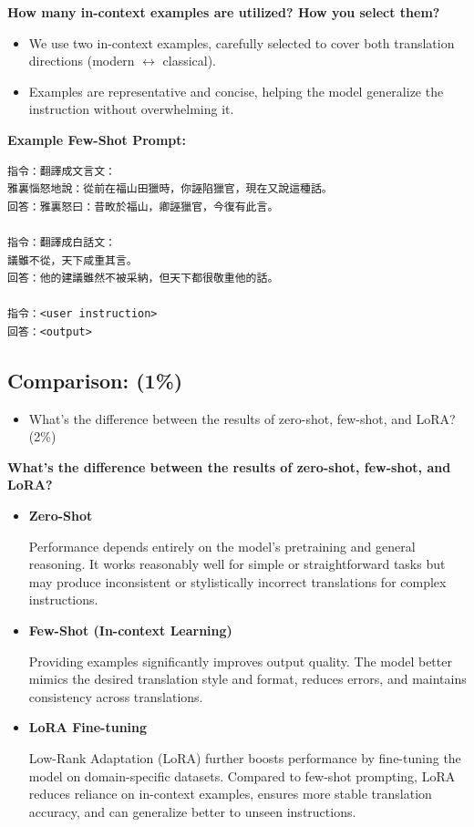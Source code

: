 \documentclass{article}
\begin{document}
\textbf{How many in-context examples are utilized? How you select them?}

\begin{itemize}
    \item We use two in-context examples, carefully selected to cover both translation directions (modern $\leftrightarrow$ classical).
    \item Examples are representative and concise, helping the model generalize the instruction without overwhelming it.
\end{itemize}

\textbf{Example Few-Shot Prompt:}

\begin{verbatim}
指令：翻譯成文言文：
雅裏惱怒地說：從前在福山田獵時，你誣陷獵官，現在又說這種話。
回答：雅裏怒曰：昔畋於福山，卿誣獵官，今復有此言。

指令：翻譯成白話文：
議雖不從，天下咸重其言。
回答：他的建議雖然不被采納，但天下都很敬重他的話。

指令：<user instruction>
回答：<output>
\end{verbatim}

\subsection{Comparison: (1\%)}
\begin{itemize}
    \item What's the difference between the results of zero-shot, few-shot, and LoRA? (2\%)
\end{itemize}

\textbf{What's the difference between the results of zero-shot, few-shot, and LoRA?}
\begin{itemize}
    \item \textbf{Zero-Shot}
    
    Performance depends entirely on the model's pretraining and general reasoning. It works reasonably well for simple or straightforward tasks but may produce inconsistent or stylistically incorrect translations for complex instructions.
    
    \item \textbf{Few-Shot (In-context Learning)}
    
    Providing examples significantly improves output quality. The model better mimics the desired translation style and format, reduces errors, and maintains consistency across translations.

    \item \textbf{LoRA Fine-tuning}
    
    Low-Rank Adaptation (LoRA) further boosts performance by fine-tuning the model on domain-specific datasets. Compared to few-shot prompting, LoRA reduces reliance on in-context examples, ensures more stable translation accuracy, and can generalize better to unseen instructions.
\end{itemize}
\end{document}
